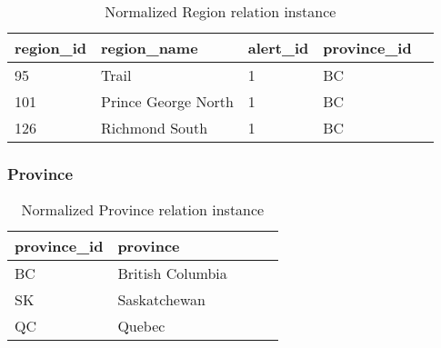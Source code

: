 \begin{table}[H]
\centering
\begin{adjustbox}{width=0.45\textwidth,center=\textwidth}
\begin{tabular}{|l|l|l|l|l|} 
        \hline
        region\_id & region\_name & alert\_id & province\_id \\ 
        \hline
        95 & Trail & 1 & BC \\
        101 & Prince George North & 1 & BC\\
        126 & Richmond South  & 1 & BC\\
        \hline
\end{tabular}
\end{adjustbox}
\caption{Normalized Region relation instance}
\end{table}


\subsubsection{Province}
\begin{table}[H]
\centering
\begin{adjustbox}{width=0.35\textwidth,center=\textwidth}
\begin{tabular}{|l|l|l|l|l|} 
        \hline
        province\_id & province \\ 
        \hline
        BC & British Columbia\\
        SK & Saskatchewan\\
        QC & Quebec\\
        \hline
\end{tabular}
\end{adjustbox}
\caption{Normalized Province relation instance}
\end{table}